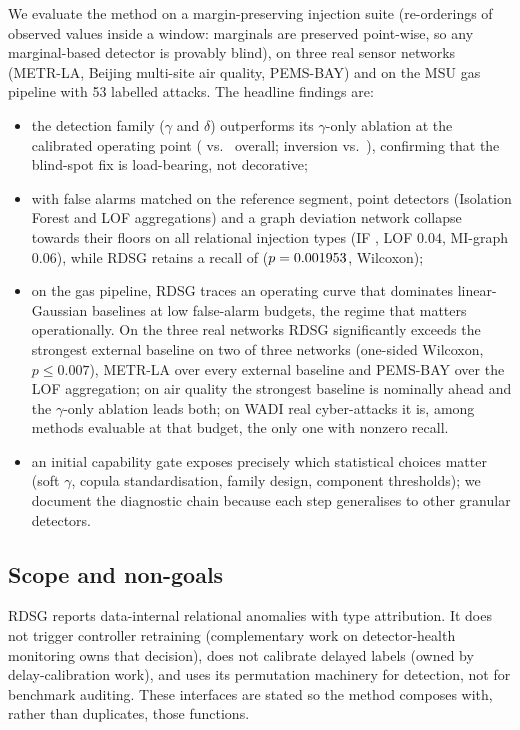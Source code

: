 \documentclass[11pt,a4paper]{article}
\newcommand{\RDSG}{RDSG}
\begin{document}
We evaluate the method on a margin-preserving injection suite (re-orderings of
observed values inside a window: marginals are preserved point-wise, so any
marginal-based detector is provably blind), on three real sensor networks
(METR-LA, Beijing multi-site air quality, PEMS-BAY) and on the MSU gas
pipeline with 53 labelled attacks. The headline findings are:
\begin{itemize}\itemsep2pt
\item the detection family ($\gamma$ and $\delta$) outperforms its $\gamma$-only ablation at the calibrated operating point
      (\eZeroRdsRecall{} vs.\ \eZeroGammaRecall{} overall; inversion
      \eZeroRdsInv{} vs.\ \eZeroGammaInv{}), confirming that the blind-spot
      fix is load-bearing, not decorative;
\item with false alarms matched on the reference segment, point detectors
      (Isolation Forest \citep{liu2008isolation} and LOF \citep{breunig2000lof} aggregations) and a graph deviation network
      collapse towards their floors on all relational injection types
      (IF \eZeroIfRecall{}, LOF $0.04$, MI-graph $0.06$), while \RDSG{}
      retains a recall of \eZeroRdsRecall{} ($p=0.001953$, Wilcoxon);
\item on the gas pipeline, \RDSG{} traces an operating curve that dominates
      linear-Gaussian baselines at low false-alarm budgets, the regime that
      matters operationally. On the three real networks RDSG significantly exceeds the strongest external baseline on two of three
networks (one-sided Wilcoxon, $p\le 0.007$), METR-LA over every
external baseline and PEMS-BAY over the LOF aggregation; on air quality
the strongest baseline is nominally ahead and the $\gamma$-only
ablation leads both; on WADI real cyber-attacks it is, among methods
evaluable at that budget, the only one with nonzero recall.
\item an initial capability gate exposes precisely which statistical choices
      matter (soft $\gamma$, copula standardisation, family design, component
      thresholds); we document the diagnostic chain because each step
      generalises to other granular detectors.
\end{itemize}

\subsection*{Scope and non-goals}
\RDSG{} reports data-internal relational anomalies with type attribution. It
does not trigger controller retraining (complementary work on detector-health
monitoring owns that decision), does not calibrate delayed labels (owned by
delay-calibration work), and uses its permutation machinery for detection, not
for benchmark auditing. These interfaces are stated so the method composes
with, rather than duplicates, those functions.
\end{document}
